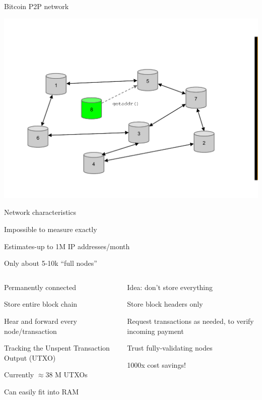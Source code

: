 \begin{frame}{Bitcoin P2P network}
\begin{overprint}
\includegraphics[width=\textwidth,page=4]{p2p-join}
\end{overprint}

\end{frame}

\begin{frame}{Network characteristics}
\BI
\item Impossible to measure exactly
\item Estimates-up to 1M IP addresses/month
\item Only about 5-10k “full nodes”
\EI

\begin{columns}[T]
\begin{column}{0.48\textwidth}
\BI
\item Permanently connected
\item Store entire block chain
\item Hear and forward every node/transaction
\item Tracking the Unspent Transaction Output (UTXO)
	\BI
	\item Currently $\approx 38$ M UTXOs
	\item Can easily fit into RAM
	\EI
\EI
\end{column}
\begin{column}{0.48\textwidth}


\BI
\item Idea: don’t store everything
\item Store block headers only
\item Request transactions as needed, to verify incoming payment
\item Trust fully-validating nodes
\item 1000x cost savings! 
\EI
\end{column}

\end{columns}

\end{frame}

